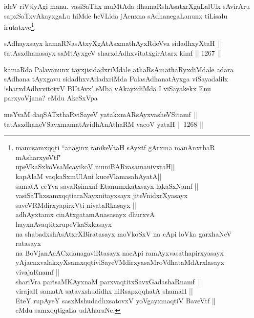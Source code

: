 \begin{artha}
ideV riVtiyAgi manu. vasiSaThx muMtAda dhamaRshAsatxrXgaLalUlx sAvirAru sapxSaTxvAkayxgaLu hiMde heVLida jAcnxna sAdhanegaLanunx tiLisalu irutatxve\footnote{manusamxqqti ``anaginx ranikeVtaH sAyxtf gArxma manAnxthaR mAsharxyeVtf"\\
upeVkaSxkoV\s saMcayikoV muniBARvasamanivxtaH||\\
kapAlaM vaqkaSxmUlAni kuceVlamasahAyatA||\\
samatA ceYva savaRsimxnf Etanumxkatxsayx lakaSxNamf ||\\ vasiSaThxsamxqqti\ndash araNayxnitayxsayx jiteVnidxrXyasayx saveVRMdirxyapirxVti nivataRkasayx ||\\
adhAyxtamx cinAtxgatamAnasasayx dhurxvA hayxnAvaqtitxrupeVkaSxkasayx \\
na shabadxshAsAtxrXBiratasayx moVkoSxV na cApi loVka garxhaNeV ratasayx\\
na BoVjanAcACxdanagaviRtasayx nacApi ramAyxvasathapirxyasayx \\ yAjacnxvalakxyXsamxqqti\ndash  viSayeVMdirxyasaMroVdhataMdArxlasayx vivajaRnamf ||\\
shariVra parisaMKAyxnaM parxvaqtitxSavxGadashaRnamf ||\\
virajaH samatA satavxshudidhx niRsapxqqhatA shamaH ||\\
EteY rupAyeY sasxMshudadhxsatovxV yoVgayxmaqtiV BaveVtf ||\\ eMdu samxqqtigaLa udAharaNe.}.
\end{artha}


\begin{shl}
sAdhayxsayx kamaRNasAtxyXgAtAsxmathAyxRdeVva sidadhxyXtaH || \\
tatAsxdhanasayx saMtAyxgeV sharxdAdhxvitatxgirA\s tarx kimf \hfill || 1267 || 
\end{shl}

\begin{artha}
kamaRda Palavanunx tayxjisidadxriMdale athaRsAmathaRyxdiMdale adara sAdhana tAyxgavu sidadhxvAdadxriMda PalasAdhanatAyxga viSayadalilx `sharxdAdhxvitotxV BUtAvx' eMba vAkayxdiMda I viSayakekx Enu parxyoVjana? eMdu AkeSxVpa
\end{artha}

\begin{shl}
meYvaM daqSATxthaRviSayeV yatakxmARsAyxvasheVSitamf || \\
tatAsxdhaneVSavxmamatAvidhAnAthaRM vacoV yataH \hfill || 1268 ||  
\end{shl}

